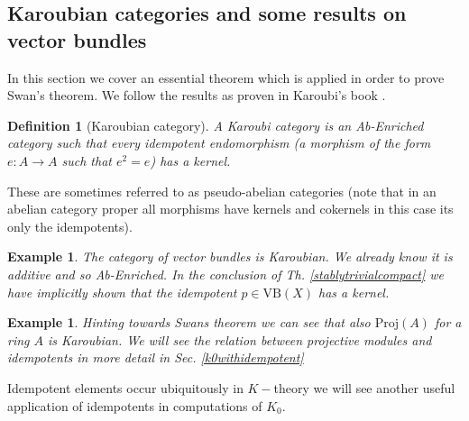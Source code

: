 \documentclass[12pt]{article}
\numberwithin{equation}{section}
\newcounter{dummy} \numberwithin{dummy}{section}
\newtheorem{definition}[dummy]{Definition}
\newtheorem{example}[dummy]{Example}
\begin{document}
	\subsection{Karoubian categories and some results on vector bundles}
	In this section we cover an essential theorem which is applied in order to prove Swan's theorem. We follow the results as proven in Karoubi's book \cite{karoubi2008k}.
	
	\begin{definition}[Karoubian category]
		A Karoubi category is an Ab-Enriched category such that every idempotent endomorphism (a morphism of the form $e:A \to A$ such that $e^2=e$) has a kernel.
	\end{definition}
	These are sometimes referred to as pseudo-abelian categories (note that in an abelian category proper all morphisms have kernels and cokernels in this case its only the idempotents).
	\begin{example}
		The category of vector bundles is Karoubian. We already know it is additive and so Ab-Enriched. In the conclusion of Th. \ref{stablytrivialcompact} we have implicitly shown that the idempotent $p \in \mathrm{VB}(X)$ has a kernel.
	\end{example}
	\begin{example}
		Hinting towards Swans theorem we can see that also $\mathrm{Proj}(A)$ for a ring $A$ is Karoubian. We will see the relation between projective modules and idempotents in more detail in Sec. \ref{k0withidempotent}
	\end{example}
	Idempotent elements occur ubiquitously in $K-$theory we will see another useful application of idempotents in computations of $K_0$.
	
\end{document}
